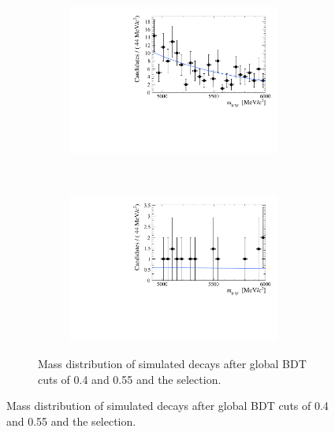 \begin{figure}[tbp]
{\begin{figure}[htbp]
    \centering
    \begin{subfigure}[b]{0.7\textwidth}
        \includegraphics[width=\textwidth]{./Figs/Selection/BDT0p4.pdf}
        \caption{ }
        \label{fig:BDT0p4}
    \end{subfigure}
    ~ %
    \begin{subfigure}[b]{0.7\textwidth}
       \includegraphics[width=\textwidth]{./Figs/Selection/BDT0p55.pdf}
        \caption{ }
        \label{fig:BDT0p5}
    \end{subfigure}
    \caption{Mass distribution of \bbarmumux simulated decays after global BDT cuts of 0.4 and 0.55 and the \bsmumu selection.}
    \label{fig:BDTmasses}
\end{figure}



}
\end{figure}
